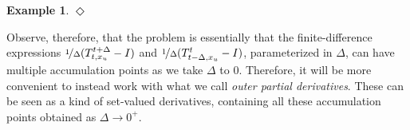 \documentclass[10pt,a4paper]{paper}
\theoremstyle{definition}
\newtheorem{exmp}{Example}%
\newcommand{\nats}{\mathbb{N}}
\newcommand{\reals}{\mathbb{R}}
\newcommand{\realspos}{\reals_{>0}}
\newcommand{\realsnonneg}{\reals_{\geq 0}}
\newcommand{\states}{\mathcal{X}}
\newcommand{\processes}{\mathbb{P}}
\newcommand{\wprocesses}{\processes^{\mathrm{W}}}
\newcommand{\wmprocesses}{\processes^{\mathrm{WM}}}
\newcommand{\norm}[1]{\left\lVert #1 \right\rVert}
\newcommand{\coloneqq}{:\!=}
\newcommand{\exampleend}{\hfill$\Diamond$}
\begin{document}
\begin{exmp}
%
%
\exampleend
\end{exmp}

Observe, therefore, that the problem is essentially that the finite-difference expressions $\nicefrac{1}{\Delta}(T_{t,x_u}^{t+\Delta} - I)$ and $\nicefrac{1}{\Delta}(T_{t-\Delta,x_u}^{t} - I)$, parameterized in $\Delta$, can have multiple accumulation points as we take $\Delta$ to $0$. Therefore, it will be more convenient to instead work with what we call \emph{outer partial derivatives}. These can be seen as a kind of set-valued derivatives, containing all these accumulation points obtained as $\Delta\to0^+$.
\end{document}
